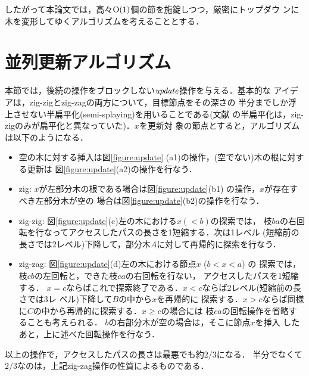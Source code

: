 \documentclass{compsoft}
\begin{document}
したがって本論文では，高々${\rm O}(1)$個の節を施錠しつつ，厳密にトップダウ
ンに木を変形してゆくアルゴリズムを考えることとする．

\section{並列更新アルゴリズム}\label{section:update}

本節では，後続の操作をブロックしない${\it update\/}$操作を与える．基本的な
アイデアは，zig-zigとzig-zagの両方について，目標節点をその深さの
半分までしか浮上させない半扁平化(semi-splaying)を用いることである(文献
\cite{ST85}の半扁平化は，zig-zigのみが扁平化と異なっていた)．$x$を更新対
象の節点とすると，アルゴリズムは以下のようになる．
%

\begin{itemize}
\item[(a)]
空の木に対する挿入は図\ref{figure:update}
(a1)の操作，(空でない)木の根に対する更新は
図\ref{figure:update}(a2)の操作を行なう．

\begin{figure*}[t]
\begin{center}
\end{center}
\caption{後続操作をブロックしない更新アルゴリズムの1ステップ}
\label{figure:update}
\end{figure*}

\item[(b)]
zig: 
$x$が左部分木の根である場合は図\ref{figure:update}(b1)
の操作，$x$が存在すべき左部分木が空の
場合は図\ref{figure:update}(b2)の操作を行なう．

\item[(c)]
zig-zig: 図\ref{figure:update}(c)左の木における$x (<b)$の探索では，
枝$ba$の右回転を行なってアクセスしたパスの長さを1短縮する．次は1レベル
(短縮前の長さでは2レベル)下降して，部分木$A$に対して再帰的に探索を行なう．

\item[(d)]
zig-zag: 図\ref{figure:update}(d)左の木における節点$x$ ($b<x<a$) の
探索では，
枝$cb$の左回転と，できた枝$ca$の右回転を行ない，
アクセスしたパスを1短縮する．
%
%
$x=c$ならばこれで探索終了である．$x<c$ならば2レベル(短縮前の長さでは3レ
ベル)下降して$B$の中から$x$を再帰的に
探索する．$x>c$ならば同様に$C$の中から再帰的に探索する．$x\ge c$の場合には
枝$ca$の回転操作を省略することも考えられる．
%
$b$の右部分木が空の場合は，そこに節点$x$を挿入
したあと，上に述べた回転操作を行なう．

\end{itemize}
以上の操作で，アクセスしたパスの長さは最悪でも約$2/3$になる．
%
半分でなくて$2/3$なのは，上記zig-zag操作の性質によるものである．
\end{document}
